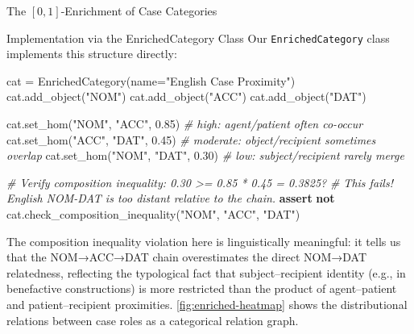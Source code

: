\documentclass[
  ignorenonframetext,
]{beamer}
\newenvironment{Shaded}{}{}
\newcommand{\CommentTok}[1]{\textcolor[rgb]{0.38,0.63,0.69}{\textit{#1}}}
\newcommand{\ControlFlowTok}[1]{\textcolor[rgb]{0.00,0.44,0.13}{\textbf{#1}}}
\newcommand{\FloatTok}[1]{\textcolor[rgb]{0.25,0.63,0.44}{#1}}
\newcommand{\KeywordTok}[1]{\textcolor[rgb]{0.00,0.44,0.13}{\textbf{#1}}}
\newcommand{\NormalTok}[1]{#1}
\newcommand{\OperatorTok}[1]{\textcolor[rgb]{0.40,0.40,0.40}{#1}}
\newcommand{\StringTok}[1]{\textcolor[rgb]{0.25,0.44,0.63}{#1}}
\begin{document}
\begin{frame}[fragile]{The \([0,1]\)-Enrichment of Case Categories}
\begin{block}{Implementation via the EnrichedCategory Class}
\protect{}\label{implementation-via-the-enrichedcategory-class}
Our \texttt{EnrichedCategory} class implements this structure directly:

\begin{Shaded}
\begin{Highlighting}[]
\NormalTok{cat }\OperatorTok{=}\NormalTok{ EnrichedCategory(name}\OperatorTok{=}\StringTok{"English Case Proximity"}\NormalTok{)}
\NormalTok{cat.add\_object(}\StringTok{"NOM"}\NormalTok{)}
\NormalTok{cat.add\_object(}\StringTok{"ACC"}\NormalTok{)}
\NormalTok{cat.add\_object(}\StringTok{"DAT"}\NormalTok{)}

\NormalTok{cat.set\_hom(}\StringTok{"NOM"}\NormalTok{, }\StringTok{"ACC"}\NormalTok{, }\FloatTok{0.85}\NormalTok{)  }\CommentTok{\# high: agent/patient often co{-}occur}
\NormalTok{cat.set\_hom(}\StringTok{"ACC"}\NormalTok{, }\StringTok{"DAT"}\NormalTok{, }\FloatTok{0.45}\NormalTok{)  }\CommentTok{\# moderate: object/recipient sometimes overlap}
\NormalTok{cat.set\_hom(}\StringTok{"NOM"}\NormalTok{, }\StringTok{"DAT"}\NormalTok{, }\FloatTok{0.30}\NormalTok{)  }\CommentTok{\# low: subject/recipient rarely merge}

\CommentTok{\# Verify composition inequality: 0.30 \textgreater{}= 0.85 * 0.45 = 0.3825?}
\CommentTok{\# This fails! English NOM{-}DAT is too distant relative to the chain.}
\ControlFlowTok{assert} \KeywordTok{not}\NormalTok{ cat.check\_composition\_inequality(}\StringTok{"NOM"}\NormalTok{, }\StringTok{"ACC"}\NormalTok{, }\StringTok{"DAT"}\NormalTok{)}
\end{Highlighting}
\end{Shaded}

The composition inequality violation here is linguistically meaningful:
it tells us that the NOM→ACC→DAT chain overestimates the direct NOM→DAT
relatedness, reflecting the typological fact that subject--recipient
identity (e.g., in benefactive constructions) is more restricted than
the product of agent--patient and patient--recipient proximities.
\autoref{fig:enriched-heatmap} shows the distributional relations
between case roles as a categorical relation graph.


\end{block}
\end{frame}
\end{document}
